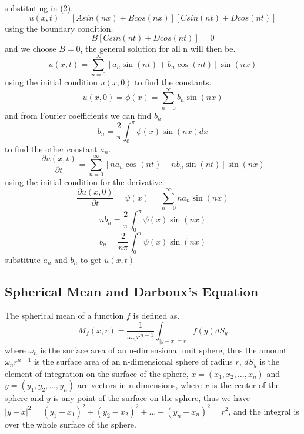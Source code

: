 \documentclass[]{article}
\begin{document}
substituting in (2).
\[
    u\left(x,t\right) = \left[Asin\left(nx\right)+Bcos\left(nx\right)\right]\left[Csin\left(nt\right)+Dcos\left(nt\right)\right]    
\]
using the boundary condition.
\[
    B\left[Csin\left(nt\right)+Dcos\left(nt\right)\right]=0    
\]
and we choose $B=0$, the general solution for all n will then be.
\[
    u\left(x,t\right) = \sum_{n=0}^{\infty}\left[a_{n}\sin\left(nt\right)+b_{n}\cos\left(nt\right)\right]\sin\left(nx\right)    
\]
using the initial condition $u(x,0)$ to find the constants.
\[
    u\left(x,0\right) = \phi\left(x\right) = \sum_{n=0}^{\infty}b_{n}\sin\left(nx\right)    
\]
and from Fourier coefficients we can find $b_n$
\[
    b_n = \frac{2}{\pi}\int_{0}^{\pi}\phi\left(x\right)\sin\left(nx\right)dx    
\]
to find the other constant $a_{n}$.
\[
    \frac{\partial u\left(x,t\right)}{\partial t} = \sum_{n=0}^{\infty}\left[na_{n}\cos\left(nt\right)-nb_{n}\sin\left(nt\right)\right]\sin\left(nx\right)    
\]
using the initial condition for the derivative.
\[
    \frac{\partial u\left(x,0\right)}{\partial t} = \psi\left(x\right)= \sum_{n=0}^{\infty}na_{n}\sin\left(nx\right)    
\]
\[
    nb_n = \frac{2}{\pi} \int_{0}^{\pi}\psi\left(x\right)\sin\left(nx\right)    
\]
\[
    b_n = \frac{2}{n\pi} \int_{0}^{\pi}\psi\left(x\right)\sin\left(nx\right)    
\]
substitute $a_n$ and $b_n$ to get $u\left(x,t\right)$

\setcounter{equation}{0}
\subsection{Spherical Mean and Darboux's Equation}
The spherical mean of a function $f$ is defined as.
\begin{equation}
M_{f}(x,r) = \frac{1}{\omega_{n}r^{n-1}} \int_{|y-x|=r} f(y)dS_y
\end{equation}
where $\omega_{n}$ is the surface area of an n-dimensional unit sphere, thus the amount $\omega_{n}r^{n-1}$ is the surface area of an n-dimensional sphere of radius $r$, $dS_y$ is the element of integration on the surface of the sphere, $x = (x_{1},x_{2}, \dots,x_{n})$ and $y = (y_{1},y_{2}, \dots,y_{n})$ are vectors in n-dimensions, where $x$ is the center of the sphere and $y$ is any point of the surface on the sphere, thus we have $|y-x|^2 = {(y_{1}-x_{1})}^2 + {(y_{2}-x_{2})}^2 + \dots + {(y_{n}-x_{n})}^2 = r^2$, and the integral is over the whole surface of the sphere.
\end{document}
